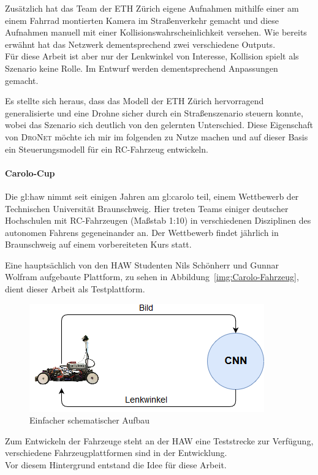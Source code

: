 Zusätzlich hat das Team der ETH Zürich eigene Aufnahmen mithilfe einer am einem Fahrrad montierten Kamera im Straßenverkehr gemacht und diese Aufnahmen manuell mit einer Kollisionswahrscheinlichkeit versehen. Wie bereits erwähnt hat das Netzwerk dementsprechend zwei verschiedene Outputs.\\
Für diese Arbeit ist aber nur der Lenkwinkel von Interesse, Kollision spielt als Szenario keine Rolle. Im Entwurf werden dementsprechend Anpassungen gemacht.

Es stellte sich heraus, dass das Modell der ETH Zürich hervorragend generalisierte und eine Drohne sicher durch ein Straßenszenario steuern konnte, wobei das Szenario sich deutlich von den gelernten Unterschied. Diese Eigenschaft von \textsc{DroNet} möchte ich mir im folgenden zu Nutze machen und auf dieser Basis ein Steuerungsmodell für ein RC-Fahrzeug entwickeln.

\paragraph{Carolo-Cup}
Die \gls{gl:haw} nimmt seit einigen Jahren am \glqq \gls{gl:carolo} \grqq{} teil, einem Wettbewerb der Technischen Universität Braunschweig. Hier treten Teams einiger deutscher Hochschulen mit RC-Fahrzeugen (Maßstab 1:10) in verschiedenen Disziplinen des autonomen Fahrens gegeneinander an. Der Wettbewerb findet jährlich in Braunschweig auf einem vorbereiteten Kurs statt.

Eine hauptsächlich von den HAW Studenten Nils Schönherr und Gunnar Wolfram aufgebaute Plattform, zu sehen in Abbildung~\ref{img:Carolo-Fahrzeug}, dient dieser Arbeit als Testplattform.

\begin{figure}[h]
	\centering
	\includegraphics[scale=0.7]{figures/Aufbau.png}
	\caption{Einfacher schematischer Aufbau }
	\label{img:Aufbau}
\end{figure}


Zum Entwickeln der Fahrzeuge steht an der HAW eine Teststrecke zur Verfügung, verschiedene Fahrzeugplattformen sind in der Entwicklung.\\
Vor diesem Hintergrund entstand die Idee für diese Arbeit.

